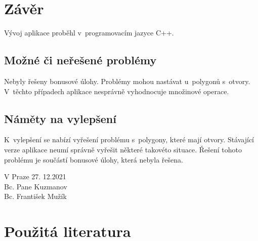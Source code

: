 \documentclass[a4paper, 12pt, oneside, titlepage]{article} %
\begin{document}
\section{Závěr}
 Vývoj aplikace proběhl v~programovacím jazyce C++. 

\subsection{Možné či neřešené problémy} \label{mcn_problemy}
Nebyly řešeny bonusové úlohy. Problémy mohou nastávat u~polygonů s~otvory. V~těchto případech aplikace nesprávně vyhodnocuje množinové operace.

\subsection{Náměty na vylepšení} \label{vylepseni}
K~vylepšení se nabízí vyřešení problému s~polygony, které mají otvory. Stávající verze aplikace neumí správně vyřešit některé takovéto situace. Řešení tohoto problému je součástí bonusové úlohy, která nebyla řešena.




\begin{flushright}
V Praze 27. 12.2021\\
\vspace{2mm}
Bc. Pane Kuzmanov\\
Bc. František Mužík\\
\end{flushright}


\clearpage 
\section*{Použitá literatura}
\renewcommand{\section}[2]{}%


\end{document}
